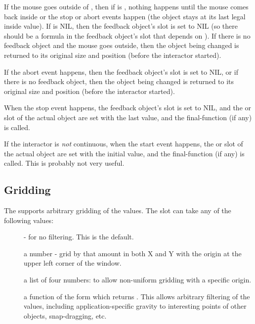 If the mouse goes outside of , then if  is
, nothing happens until the mouse comes back inside or the stop
or abort events happen (the object stays at its last legal inside value).
If  is NIL, then the feedback
object's  slot is set to NIL (so there should be a formula in
the feedback object's  slot that depends on ).
If there is no feedback object and the mouse goes outside, then the object
being changed is returned to its original size and position (before the
interactor started).

If the abort event happens, then the feedback
object's  slot is set to NIL, or if there is no feedback
object, then the object being changed is returned to its original size and
position (before the interactor started).

When the stop event happens, the feedback object's  slot is
set to NIL, and the  or  slot of the actual object are
set with the last value, and the final-function
(if any) is called.

If the interactor is {\it not} continuous, when the start event happens, the
 or  slot of the actual object are
set with the initial value, and the final-function
(if any) is called.  This is probably not very useful.

\subsection{Gridding}
\label{gridding}
The  supports arbitrary gridding of the
values.  The slot  can take any of the following
values:
\begin{description}
\item[]  -  for no filtering.  This is the default.

\item[] a number - grid by that amount in both X and Y with the origin at the
upper left corner of the window.

\item[] a list of four numbers:  to allow
non-uniform gridding with a specific origin.

\item[] a function of the form  which returns
.  This allows arbitrary filtering of the
values, including application-specific gravity to interesting
points of other objects, snap-dragging, etc.
\end{description}

